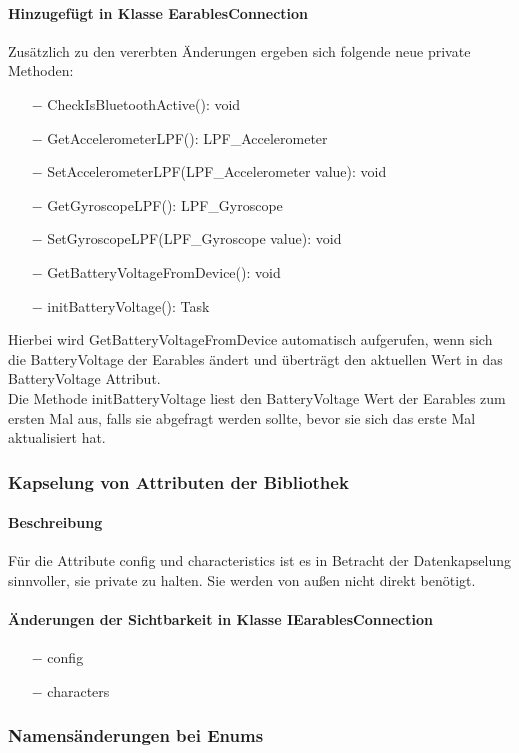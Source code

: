 \documentclass[a4paper,12pt]{article}
\begin{document}
\paragraph{Hinzugefügt in Klasse EarablesConnection}
Zusätzlich zu den vererbten Änderungen ergeben sich folgende neue private Methoden:
\begin{itemize}
	\item[$-$] CheckIsBluetoothActive(): void
	\item[$-$] GetAccelerometerLPF(): LPF\_Accelerometer
	\item[$-$] SetAccelerometerLPF(LPF\_Accelerometer value): void
	\item[$-$] GetGyroscopeLPF(): LPF\_Gyroscope
	\item[$-$] SetGyroscopeLPF(LPF\_Gyroscope value): void
	\item[$-$] GetBatteryVoltageFromDevice(): void
	\item[$-$] initBatteryVoltage(): Task
\end{itemize}
  Hierbei wird GetBatteryVoltageFromDevice automatisch aufgerufen, wenn sich die BatteryVoltage der Earables ändert und überträgt den aktuellen Wert in das BatteryVoltage Attribut.\\
  Die Methode initBatteryVoltage liest den BatteryVoltage Wert der Earables zum ersten Mal aus, falls sie abgefragt werden sollte, bevor sie sich das erste Mal aktualisiert hat.

\subsubsection{Kapselung von Attributen der Bibliothek}
\paragraph{Beschreibung}
Für die Attribute config und characteristics ist es in Betracht der Datenkapselung sinnvoller, sie private zu halten. Sie werden von außen nicht direkt benötigt.
\paragraph{Änderungen der Sichtbarkeit in Klasse IEarablesConnection}
\begin{itemize}
	\item[$-$] config
	\item[$-$] characters
\end{itemize}


\subsubsection{Namensänderungen bei Enums}
\end{document}
